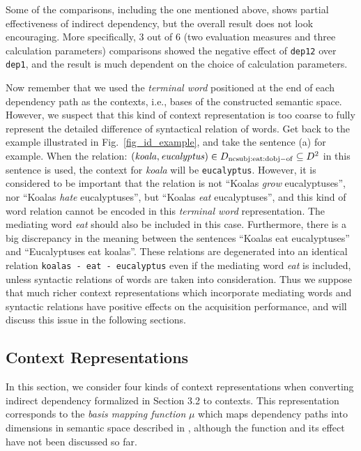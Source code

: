 \documentclass[english]{jnlp_1.4}
\begin{document}
Some of the comparisons, including the one mentioned above, shows
partial effectiveness of indirect dependency, but the overall result
does not look encouraging. More specifically, 3 out of 6 (two
evaluation measures and three calculation parameters) comparisons
showed the negative effect of \verb|dep12| over \verb|dep1|, and the
result is much dependent on the choice of calculation parameters.

Now remember that we used the {\em terminal word} positioned at the
end of each dependency path as the contexts, i.e., bases of the
constructed semantic space. However, we suspect that this kind of
context representation is too coarse to fully represent the detailed
difference of syntactical relation of words. Get back to the example
illustrated in Fig.~\ref{fig_id_example}, and take the sentence (a)
for example. When the relation: $({\it koala}, {\it eucalyptus}) \in
D_{\rm ncsubj:eat:dobj-of} \subseteq D^2$ in this sentence is used, the
context for {\it koala} will be \verb|eucalyptus|. However, it is
considered to be important that the relation is not ``Koalas {\em
  grow} eucalyptuses'', nor ``Koalas {\em hate} eucalyptuses'', but
``Koalas {\em eat} eucalyptuses'', and this kind of word relation
cannot be encoded in this {\em terminal word} representation. The
mediating word {\em eat} should also be included in this
case. Furthermore, there is a big discrepancy in the meaning between
the sentences ``Koalas eat eucalyptuses'' and ``Eucalyptuses eat
koalas''. These relations are degenerated into an identical relation
\verb|koalas - eat - eucalyptus| even if the mediating word {\em eat}
is included, unless syntactic relations of words are taken into
consideration. Thus we suppose that much richer context
representations which incorporate mediating words and syntactic
relations have positive effects on the acquisition performance, and
will discuss this issue in the following sections.

\subsection{Context Representations}

In this section, we consider four kinds of context representations
when converting indirect dependency formalized in Section 3.2 to
contexts.  This representation corresponds to the {\em basis mapping
  function} $\mu$ which maps dependency paths into dimensions in
semantic space described in \cite{Pado:07}, although the function and
its effect have not been discussed so far.
\end{document}
